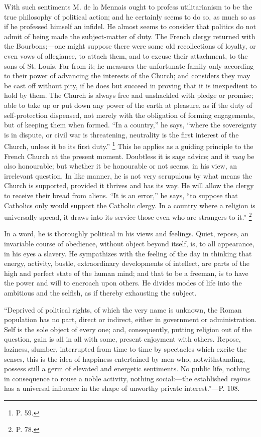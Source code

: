 With such sentiments M. de la Mennais ought to
profess utilitarianism to be the true philosophy of political action;
and he certainly seems to do so, as much so as if he professed himself
an infidel. He almost seems to consider that politics do not admit of
being made the subject-matter of duty. The French clergy returned with
the Bourbons;—one might suppose there were some old recollections of
loyalty, or even vows of allegiance, to attach them, and to excuse
their attachment, to the sons of St. Louis. Far from it; he measures
the unfortunate family only according to their power of advancing the
interests of the Church; and considers they may be cast off without
pity, if he does but succeed in proving that it is inexpedient to hold
by them. The Church is always free and unshackled with pledge or
promise; able to take up or put down any power of the earth at
pleasure, as if the duty of self-protection dispensed, not merely with
the obligation of forming engagements, but of keeping them when
formed. ``In a country,'' he says, ``where the sovereignty is in dispute,
or civil war is threatening, neutrality is the first interest of the
Church, unless it be its first duty.'' \footnote{P. 59.} This he applies as a guiding principle to the French Church at
the present moment. Doubtless it is sage advice; and it \emph{may} be also
honourable; but whether it be honourable or not seems, in his view, an
irrelevant question. In like manner, he is not very scrupulous by what
means the Church is supported, provided it thrives and has its way. He
will allow the clergy to receive their bread from aliens. ``It is an
error,'' he says, ``to suppose that Catholics only would support the
Catholic clergy. In a country where a religion is universally spread,
it draws into its service those even who are strangers to it.'' \footnote{P. 78.}

In a word, he is thoroughly political in his
views and feelings. Quiet, repose, an invariable course of obedience,
without object beyond itself, is, to all appearance, in his eyes a
slavery. He sympathizes with the feeling of the day in thinking that
energy, activity, bustle, extraordinary developments of intellect, are
parts of the high and perfect state of the human mind; and that to be
a freeman, is to have the power and will to encroach upon others. He
divides modes of life into the ambitious and the selfish, as if
thereby exhausting the subject.

``Deprived
of political rights, of which the very name is unknown, the Roman
population has no part, direct or indirect, either in government or
administration. Self is the sole object of every one; and,
consequently, putting religion out of the question, gain is
all in all with some, present
enjoyment with others. Repose, laziness, slumber, interrupted from
time to time by spectacles which excite the senses, this is the idea
of happiness entertained by men who, notwithstanding, possess still a
germ of elevated and energetic sentiments. No public life, nothing in
consequence to rouse a noble activity, nothing social:—the
established \emph{regime} has a universal influence in the shape of
unworthy private interest.''—P. 108.

